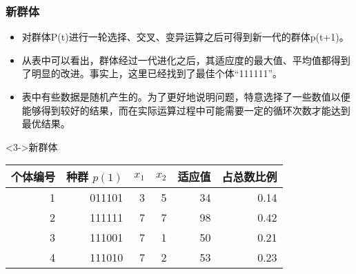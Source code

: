\documentclass{beamer}
\begin{document}
\begin{frame}
\frametitle{新群体}
\label{sec-2-8}


\begin{itemize}
\item <2-> 对群体P(t)进行一轮选择、交叉、变异运算之后可得到新一代的群体p(t+1)。
\item <4-> 从表中可以看出，群体经过一代进化之后，其适应度的最大值、平均值都得到了明显的改进。事实上，这里已经找到了最佳个体“111111”。
\item <5-> 表中有些数据是随机产生的。为了更好地说明问题，特意选择了一些数值以便能够得到较好的结果，而在实际运算过程中可能需要一定的循环次数才能达到最优结果。
\end{itemize}
\begin{block}<3->{新群体}
\label{sec-2-8-1}


\begin{center}
\begin{tabular}{rrrrrr}
 个体编号  &  种群 $p(1)$  &  $x_1$  &  $x_2$  &  适应值  &  占总数比例  \\
\hline
        1  &       011101  &      3  &      5  &      34  &        0.14  \\
        2  &       111111  &      7  &      7  &      98  &        0.42  \\
        3  &       111001  &      7  &      1  &      50  &        0.21  \\
        4  &       111010  &      7  &      2  &      53  &        0.23  \\
\end{tabular}
\end{center}
\end{block}
\end{frame}
\end{document}
